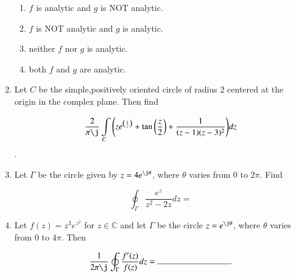 \documentclass[journal,12pt,twocolumn]{IEEEtran}
\begin{document}
\begin{enumerate}[1.]
\begin{enumerate}

\item
$f$ is analytic and $g$ is NOT analytic.

\item
$f$ is NOT analytic and $g$ is analytic.

\item
neither $f$ nor $g$ is analytic.

\item
both $f$ and $g$ are analytic.

\end{enumerate}

\item Let $C$ be the simple,positively oriented circle of radius $2$ centered at the origin in the complex plane. Then find

$$\frac{2}{\pi \j} \int\limits_{C} \Bigg( z e^{\big(\frac{1}{z}\big)} + \tan \bigg(\frac{z}{2} \bigg) + \frac{1}{(z-1)(z-3)^2} \Bigg) dz $$ . 

\item Let $\Gamma $ be the circle given by $z=4 e^{\j \theta}$, where $\theta$ varies from $ 0 $ to $ 2 \pi $. Find

$$ \oint_{\Gamma} \frac{e^z}{z^2-2z} dz = $$

%
%
%
%

\item Let $f(z)= z^3e^{z^2}$ for $z \in \mathbb{C}$ and let $\Gamma$ be the circle $z= e^{\j \theta}$, where $\theta$ varies from $0$ to $4 \pi $. Then

$$ \frac{1}{2 \pi \j} \oint_{\Gamma} \frac{f'(z)}{f(z)} dz= \rule{3cm}{0.15mm}.$$


\end{enumerate}
\end{document}
